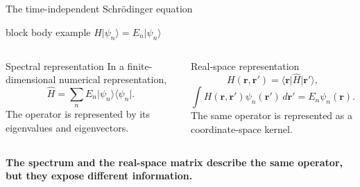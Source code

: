 \documentclass[aspectratio=169,10pt]{beamer}
\begin{document}
\begin{frame}{The time-independent Schrödinger equation}
  \small
  \begin{beamercolorbox}[rounded=true,sep=0.55em,wd=\textwidth]{block body example}
    \centering\Large\bfseries\color{resultblue}
    $\hat H\lvert\psi_n\rangle=E_n\lvert\psi_n\rangle$
  \end{beamercolorbox}
  \vspace{0.6em}
  \begin{columns}[T]
      \begin{block}{Spectral representation}
        In a finite-dimensional numerical representation,
        \[
          \hat H=\sum_n E_n
          \lvert\psi_n\rangle\langle\psi_n\rvert.
        \]
        The operator is represented by its eigenvalues and eigenvectors.
      \end{block}
      \begin{exampleblock}{Real-space representation}
        \[
          H(\mathbf r,\mathbf r')
          =\langle\mathbf r\rvert\hat H\lvert\mathbf r'\rangle,
        \]
        \[
          \int H(\mathbf r,\mathbf r')\psi_n(\mathbf r')\,d\mathbf r'
          =E_n\psi_n(\mathbf r).
        \]
        The same operator is represented as a coordinate-space kernel.
      \end{exampleblock}
  \end{columns}
  \vspace{0.35em}
  \centering\textbf{The spectrum and the real-space matrix describe the same operator,
  but they expose different information.}
\end{frame}
\end{document}
